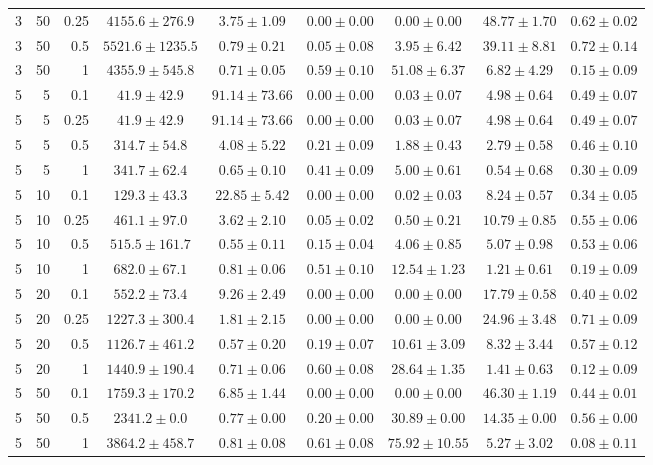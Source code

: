 \begin{table}[htbp]
\begin{tabular}{@{}rrrcccccc@{}}
3 & 50 & 0.25 & $4155.6 \pm 276.9$ & $3.75 \pm 1.09$ & $0.00 \pm 0.00$ & $0.00 \pm 0.00$ & $48.77 \pm 1.70$ & $0.62 \pm 0.02$ \\
3 & 50 & 0.5 & $5521.6 \pm 1235.5$ & $0.79 \pm 0.21$ & $0.05 \pm 0.08$ & $3.95 \pm 6.42$ & $39.11 \pm 8.81$ & $0.72 \pm 0.14$ \\
3 & 50 & 1 & $4355.9 \pm 545.8$ & $0.71 \pm 0.05$ & $0.59 \pm 0.10$ & $51.08 \pm 6.37$ & $6.82 \pm 4.29$ & $0.15 \pm 0.09$ \\
\midrule
5 & 5 & 0.1 & $41.9 \pm 42.9$ & $91.14 \pm 73.66$ & $0.00 \pm 0.00$ & $0.03 \pm 0.07$ & $4.98 \pm 0.64$ & $0.49 \pm 0.07$ \\
5 & 5 & 0.25 & $41.9 \pm 42.9$ & $91.14 \pm 73.66$ & $0.00 \pm 0.00$ & $0.03 \pm 0.07$ & $4.98 \pm 0.64$ & $0.49 \pm 0.07$ \\
5 & 5 & 0.5 & $314.7 \pm 54.8$ & $4.08 \pm 5.22$ & $0.21 \pm 0.09$ & $1.88 \pm 0.43$ & $2.79 \pm 0.58$ & $0.46 \pm 0.10$ \\
5 & 5 & 1 & $341.7 \pm 62.4$ & $0.65 \pm 0.10$ & $0.41 \pm 0.09$ & $5.00 \pm 0.61$ & $0.54 \pm 0.68$ & $0.30 \pm 0.09$ \\
5 & 10 & 0.1 & $129.3 \pm 43.3$ & $22.85 \pm 5.42$ & $0.00 \pm 0.00$ & $0.02 \pm 0.03$ & $8.24 \pm 0.57$ & $0.34 \pm 0.05$ \\
5 & 10 & 0.25 & $461.1 \pm 97.0$ & $3.62 \pm 2.10$ & $0.05 \pm 0.02$ & $0.50 \pm 0.21$ & $10.79 \pm 0.85$ & $0.55 \pm 0.06$ \\
5 & 10 & 0.5 & $515.5 \pm 161.7$ & $0.55 \pm 0.11$ & $0.15 \pm 0.04$ & $4.06 \pm 0.85$ & $5.07 \pm 0.98$ & $0.53 \pm 0.06$ \\
5 & 10 & 1 & $682.0 \pm 67.1$ & $0.81 \pm 0.06$ & $0.51 \pm 0.10$ & $12.54 \pm 1.23$ & $1.21 \pm 0.61$ & $0.19 \pm 0.09$ \\
5 & 20 & 0.1 & $552.2 \pm 73.4$ & $9.26 \pm 2.49$ & $0.00 \pm 0.00$ & $0.00 \pm 0.00$ & $17.79 \pm 0.58$ & $0.40 \pm 0.02$ \\
5 & 20 & 0.25 & $1227.3 \pm 300.4$ & $1.81 \pm 2.15$ & $0.00 \pm 0.00$ & $0.00 \pm 0.00$ & $24.96 \pm 3.48$ & $0.71 \pm 0.09$ \\
5 & 20 & 0.5 & $1126.7 \pm 461.2$ & $0.57 \pm 0.20$ & $0.19 \pm 0.07$ & $10.61 \pm 3.09$ & $8.32 \pm 3.44$ & $0.57 \pm 0.12$ \\
5 & 20 & 1 & $1440.9 \pm 190.4$ & $0.71 \pm 0.06$ & $0.60 \pm 0.08$ & $28.64 \pm 1.35$ & $1.41 \pm 0.63$ & $0.12 \pm 0.09$ \\
5 & 50 & 0.1 & $1759.3 \pm 170.2$ & $6.85 \pm 1.44$ & $0.00 \pm 0.00$ & $0.00 \pm 0.00$ & $46.30 \pm 1.19$ & $0.44 \pm 0.01$ \\
5 & 50 & 0.5 & $2341.2 \pm 0.0$ & $0.77 \pm 0.00$ & $0.20 \pm 0.00$ & $30.89 \pm 0.00$ & $14.35 \pm 0.00$ & $0.56 \pm 0.00$ \\
5 & 50 & 1 & $3864.2 \pm 458.7$ & $0.81 \pm 0.08$ & $0.61 \pm 0.08$ & $75.92 \pm 10.55$ & $5.27 \pm 3.02$ & $0.08 \pm 0.11$ \\
\bottomrule
\end{tabular}
\end{table}
